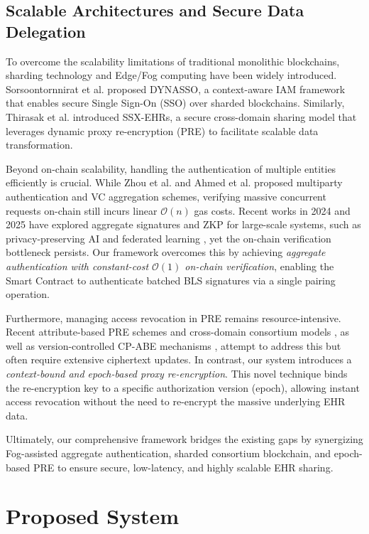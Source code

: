 \documentclass[conference]{IEEEtran}
\begin{document}
\subsection{Scalable Architectures and Secure Data Delegation}

To overcome the scalability limitations of traditional monolithic blockchains, sharding technology and Edge/Fog computing have been widely introduced. Sorsoontornnirat et al. \cite{b15} proposed DYNASSO, a context-aware IAM framework that enables secure Single Sign-On (SSO) over sharded blockchains. Similarly, Thirasak et al. \cite{b12} introduced SSX-EHRs, a secure cross-domain sharing model that leverages dynamic proxy re-encryption (PRE) to facilitate scalable data transformation. 
\medskip

Beyond on-chain scalability, handling the authentication of multiple entities efficiently is crucial. While Zhou et al. \cite{b10} and Ahmed et al. \cite{b9} proposed multiparty authentication and VC aggregation schemes, verifying massive concurrent requests on-chain still incurs linear $\mathcal{O}(n)$ gas costs. Recent works in 2024 and 2025 have explored aggregate signatures and ZKP for large-scale systems, such as privacy-preserving AI \cite{b25} and federated learning \cite{b26}, yet the on-chain verification bottleneck persists. Our framework overcomes this by achieving \textit{aggregate authentication with constant-cost $\mathcal{O}(1)$ on-chain verification}, enabling the Smart Contract to authenticate batched BLS signatures via a single pairing operation.
\medskip

Furthermore, managing access revocation in PRE remains resource-intensive. Recent attribute-based PRE schemes \cite{b28} and cross-domain consortium models \cite{b29}, as well as version-controlled CP-ABE mechanisms \cite{b27}, attempt to address this but often require extensive ciphertext updates. In contrast, our system introduces a \textit{context-bound and epoch-based proxy re-encryption}. This novel technique binds the re-encryption key to a specific authorization version (epoch), allowing instant access revocation without the need to re-encrypt the massive underlying EHR data. 
\medskip

Ultimately, our comprehensive framework bridges the existing gaps by synergizing Fog-assisted aggregate authentication, sharded consortium blockchain, and epoch-based PRE to ensure secure, low-latency, and highly scalable EHR sharing.


\section{Proposed System}
\label{sec:system}
\end{document}
